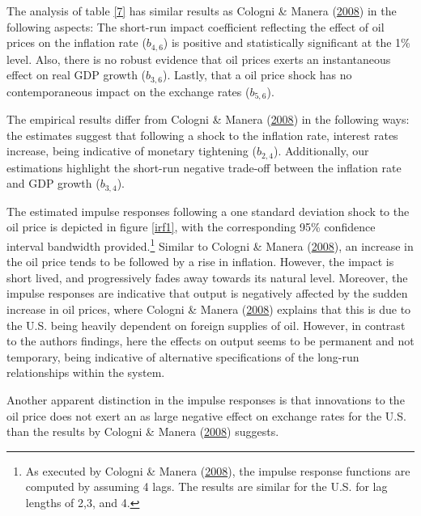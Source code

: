 \documentclass[11pt,preprint, authoryear]{elsarticle}
\numberwithin{equation}{section}
\numberwithin{figure}{section}
\numberwithin{table}{section}
\let\rmarkdownfootnote\footnote%
\def\footnote{\protect\rmarkdownfootnote}
\begin{document}
The analysis of table \ref{7} has similar results as Cologni \& Manera
(\protect\hyperlink{ref-cologni2008}{2008}) in the following aspects:
The short-run impact coefficient reflecting the effect of oil prices on
the inflation rate (\(b_{4,6}\)) is positive and statistically
significant at the 1\% level. Also, there is no robust evidence that oil
prices exerts an instantaneous effect on real GDP growth (\(b_{3,6}\)).
Lastly, that a oil price shock has no contemporaneous impact on the
exchange rates (\(b_{5,6}\)).

The empirical results differ from Cologni \& Manera
(\protect\hyperlink{ref-cologni2008}{2008}) in the following ways: the
estimates suggest that following a shock to the inflation rate, interest
rates increase, being indicative of monetary tightening (\(b_{2,4}\)).
Additionally, our estimations highlight the short-run negative trade-off
between the inflation rate and GDP growth (\(b_{3,4}\)).

The estimated impulse responses following a one standard deviation shock
to the oil price is depicted in figure \ref{irf1}, with the
corresponding 95\% confidence interval bandwidth provided.\footnote{As
  executed by Cologni \& Manera
  (\protect\hyperlink{ref-cologni2008}{2008}), the impulse response
  functions are computed by assuming 4 lags. The results are similar for
  the U.S. for lag lengths of 2,3, and 4.} Similar to Cologni \& Manera
(\protect\hyperlink{ref-cologni2008}{2008}), an increase in the oil
price tends to be followed by a rise in inflation. However, the impact
is short lived, and progressively fades away towards its natural level.
Moreover, the impulse responses are indicative that output is negatively
affected by the sudden increase in oil prices, where Cologni \& Manera
(\protect\hyperlink{ref-cologni2008}{2008}) explains that this is due to
the U.S. being heavily dependent on foreign supplies of oil. However, in
contrast to the authors findings, here the effects on output seems to be
permanent and not temporary, being indicative of alternative
specifications of the long-run relationships within the system.

Another apparent distinction in the impulse responses is that
innovations to the oil price does not exert an as large negative effect
on exchange rates for the U.S. than the results by Cologni \& Manera
(\protect\hyperlink{ref-cologni2008}{2008}) suggests.
\end{document}
